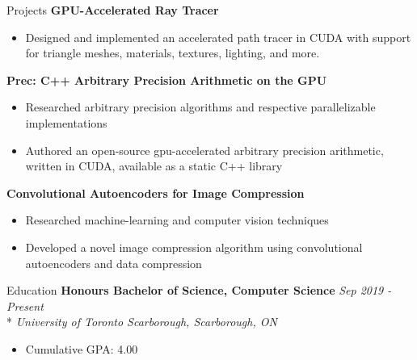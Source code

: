\documentclass[11pt, letterpaper]{article}
\begin{document}
\begin{section}{Projects}
\textbf{GPU-Accelerated Ray Tracer}
\begin{itemize}
  \item Designed and implemented an accelerated path tracer in CUDA with support for triangle meshes, materials, textures, lighting, and more.\\
\end{itemize}

\textbf{Prec: C++ Arbitrary Precision Arithmetic on the GPU}
\begin{itemize}
  \item Researched arbitrary precision algorithms and respective parallelizable implementations
  \item Authored an open-source gpu-accelerated arbitrary precision arithmetic, written in CUDA, available as a static C++ library\\
\end{itemize}

\textbf{Convolutional Autoencoders for Image Compression}
\begin{itemize}
  \item Researched machine-learning and computer vision techniques
  \item Developed a novel image compression algorithm using convolutional autoencoders and data compression
\end{itemize}

\end{section}

\begin{section}{Education}
\textbf{Honours Bachelor of Science, Computer Science}
\hfill
\textit{Sep 2019 - Present}\\*
\textit{University of Toronto Scarborough, Scarborough, ON}
\begin{itemize}
  \item Cumulative GPA: 4.00
\end{itemize}

\end{section}
\end{document}
